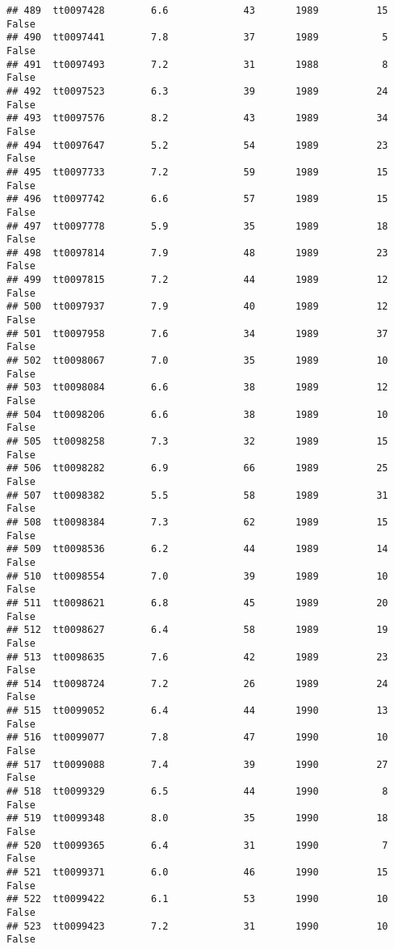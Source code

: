 \documentclass[
]{article}
\begin{document}
\begin{verbatim}
## 489  tt0097428        6.6             43       1989          15   False
## 490  tt0097441        7.8             37       1989           5   False
## 491  tt0097493        7.2             31       1988           8   False
## 492  tt0097523        6.3             39       1989          24   False
## 493  tt0097576        8.2             43       1989          34   False
## 494  tt0097647        5.2             54       1989          23   False
## 495  tt0097733        7.2             59       1989          15   False
## 496  tt0097742        6.6             57       1989          15   False
## 497  tt0097778        5.9             35       1989          18   False
## 498  tt0097814        7.9             48       1989          23   False
## 499  tt0097815        7.2             44       1989          12   False
## 500  tt0097937        7.9             40       1989          12   False
## 501  tt0097958        7.6             34       1989          37   False
## 502  tt0098067        7.0             35       1989          10   False
## 503  tt0098084        6.6             38       1989          12   False
## 504  tt0098206        6.6             38       1989          10   False
## 505  tt0098258        7.3             32       1989          15   False
## 506  tt0098282        6.9             66       1989          25   False
## 507  tt0098382        5.5             58       1989          31   False
## 508  tt0098384        7.3             62       1989          15   False
## 509  tt0098536        6.2             44       1989          14   False
## 510  tt0098554        7.0             39       1989          10   False
## 511  tt0098621        6.8             45       1989          20   False
## 512  tt0098627        6.4             58       1989          19   False
## 513  tt0098635        7.6             42       1989          23   False
## 514  tt0098724        7.2             26       1989          24   False
## 515  tt0099052        6.4             44       1990          13   False
## 516  tt0099077        7.8             47       1990          10   False
## 517  tt0099088        7.4             39       1990          27   False
## 518  tt0099329        6.5             44       1990           8   False
## 519  tt0099348        8.0             35       1990          18   False
## 520  tt0099365        6.4             31       1990           7   False
## 521  tt0099371        6.0             46       1990          15   False
## 522  tt0099422        6.1             53       1990          10   False
## 523  tt0099423        7.2             31       1990          10   False

\end{verbatim}
\end{document}
